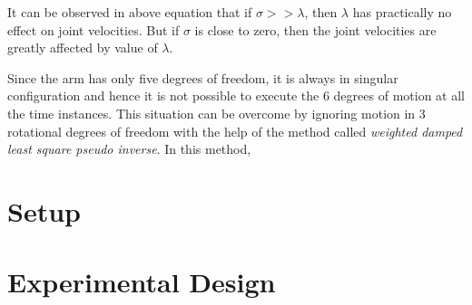 It can be observed in above equation that if $\sigma >> \lambda$, then $\lambda$ has practically no effect on joint velocities. But if $\sigma$ is close to zero, then the joint velocities are greatly affected by value of $\lambda$.  

Since the arm has only five degrees of freedom, it is always in singular configuration and hence it is not possible to execute the 6 degrees of motion at all the time instances. This situation can be overcome by ignoring motion in 3 rotational degrees of freedom with the help of the method called \textit{weighted damped least square pseudo inverse}. In this method, 	
\section{Setup}


\section{Experimental Design}
